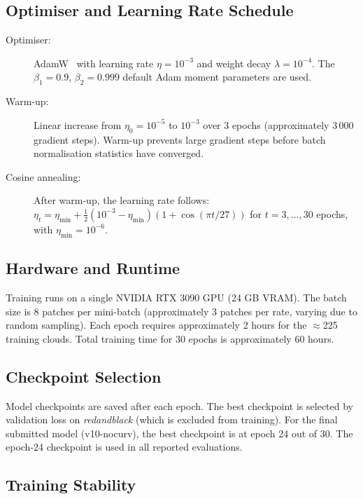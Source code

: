 \subsection{Optimiser and Learning Rate Schedule}

\begin{description}
  \item[Optimiser:] AdamW~\cite{loshchilov2017decoupled} with learning rate
    $\eta = 10^{-3}$ and weight decay $\lambda = 10^{-4}$.
    The $\beta_1 = 0.9$, $\beta_2 = 0.999$ default Adam moment parameters
    are used.

  \item[Warm-up:] Linear increase from $\eta_0 = 10^{-5}$ to $10^{-3}$ over
    3 epochs (approximately 3\,000 gradient steps).
    Warm-up prevents large gradient steps before batch normalisation statistics
    have converged.

  \item[Cosine annealing:] After warm-up, the learning rate follows:
    $\eta_t = \eta_{\min} + \frac{1}{2}(10^{-3} - \eta_{\min})(1 + \cos(\pi t / 27))$
    for $t = 3, \ldots, 30$ epochs, with $\eta_{\min} = 10^{-6}$.
\end{description}

\subsection{Hardware and Runtime}

Training runs on a single NVIDIA RTX 3090 GPU (24 GB VRAM).
The batch size is 8 patches per mini-batch (approximately 3 patches per rate,
varying due to random sampling).
Each epoch requires approximately 2 hours for the $\approx$225 training clouds.
Total training time for 30 epochs is approximately 60 hours.

\subsection{Checkpoint Selection}

Model checkpoints are saved after each epoch.
The best checkpoint is selected by validation loss on \textit{redandblack}
(which is excluded from training).
For the final submitted model (v10-nocurv), the best checkpoint is at epoch 24
out of 30.
The epoch-24 checkpoint is used in all reported evaluations.

\subsection{Training Stability}

